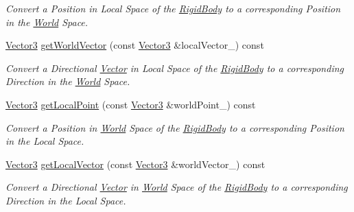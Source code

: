 \begin{DoxyCompactItemize}
\begin{DoxyCompactList}\small\item\em Convert a Position in Local Space of the \hyperlink{class_i_dream_sky_1_1_physics3_1_1_rigid_body}{Rigid\+Body} to a corresponding Position in the \hyperlink{class_i_dream_sky_1_1_physics3_1_1_world}{World} Space. \end{DoxyCompactList}\item 
\hyperlink{class_i_dream_sky_1_1_vector3}{Vector3} \hyperlink{class_i_dream_sky_1_1_physics3_1_1_rigid_body_a3ec487fedfcc7b719439e709bf8d3fc0}{get\+World\+Vector} (const \hyperlink{class_i_dream_sky_1_1_vector3}{Vector3} \&local\+Vector\+\_\+) const 
\begin{DoxyCompactList}\small\item\em Convert a Directional \hyperlink{class_i_dream_sky_1_1_vector}{Vector} in Local Space of the \hyperlink{class_i_dream_sky_1_1_physics3_1_1_rigid_body}{Rigid\+Body} to a corresponding Direction in the \hyperlink{class_i_dream_sky_1_1_physics3_1_1_world}{World} Space. \end{DoxyCompactList}\item 
\hyperlink{class_i_dream_sky_1_1_vector3}{Vector3} \hyperlink{class_i_dream_sky_1_1_physics3_1_1_rigid_body_ab35b04ae4f947039424039d53f6a6f02}{get\+Local\+Point} (const \hyperlink{class_i_dream_sky_1_1_vector3}{Vector3} \&world\+Point\+\_\+) const 
\begin{DoxyCompactList}\small\item\em Convert a Position in \hyperlink{class_i_dream_sky_1_1_physics3_1_1_world}{World} Space of the \hyperlink{class_i_dream_sky_1_1_physics3_1_1_rigid_body}{Rigid\+Body} to a corresponding Position in the Local Space. \end{DoxyCompactList}\item 
\hyperlink{class_i_dream_sky_1_1_vector3}{Vector3} \hyperlink{class_i_dream_sky_1_1_physics3_1_1_rigid_body_a805d3ffcbbb1b8ac8b171026f23a795b}{get\+Local\+Vector} (const \hyperlink{class_i_dream_sky_1_1_vector3}{Vector3} \&world\+Vector\+\_\+) const 
\begin{DoxyCompactList}\small\item\em Convert a Directional \hyperlink{class_i_dream_sky_1_1_vector}{Vector} in \hyperlink{class_i_dream_sky_1_1_physics3_1_1_world}{World} Space of the \hyperlink{class_i_dream_sky_1_1_physics3_1_1_rigid_body}{Rigid\+Body} to a corresponding Direction in the Local Space. \end{DoxyCompactList}\item 

\end{DoxyCompactItemize}
